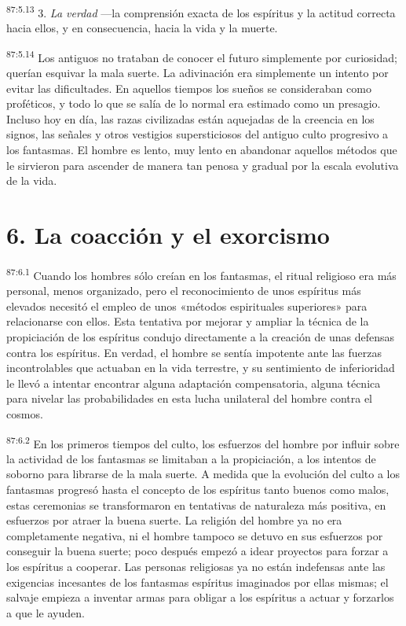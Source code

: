 \par
\textsuperscript{87:5.13} 3. \textit{La verdad} ---la comprensión exacta de los espíritus y la actitud correcta hacia ellos, y en consecuencia, hacia la vida y la muerte.

\par
\textsuperscript{87:5.14} Los antiguos no trataban de conocer el futuro simplemente por curiosidad; querían esquivar la mala suerte. La adivinación era simplemente un intento por evitar las dificultades. En aquellos tiempos los sueños se consideraban como proféticos, y todo lo que se salía de lo normal era estimado como un presagio. Incluso hoy en día, las razas civilizadas están aquejadas de la creencia en los signos, las señales y otros vestigios supersticiosos del antiguo culto progresivo a los fantasmas. El hombre es lento, muy lento en abandonar aquellos métodos que le sirvieron para ascender de manera tan penosa y gradual por la escala evolutiva de la vida.

\section*{6. La coacción y el exorcismo}
\par
\textsuperscript{87:6.1} Cuando los hombres sólo creían en los fantasmas, el ritual religioso era más personal, menos organizado, pero el reconocimiento de unos espíritus más elevados necesitó el empleo de unos «métodos espirituales superiores» para relacionarse con ellos. Esta tentativa por mejorar y ampliar la técnica de la propiciación de los espíritus condujo directamente a la creación de unas defensas contra los espíritus. En verdad, el hombre se sentía impotente ante las fuerzas incontrolables que actuaban en la vida terrestre, y su sentimiento de inferioridad le llevó a intentar encontrar alguna adaptación compensatoria, alguna técnica para nivelar las probabilidades en esta lucha unilateral del hombre contra el cosmos.

\par
\textsuperscript{87:6.2} En los primeros tiempos del culto, los esfuerzos del hombre por influir sobre la actividad de los fantasmas se limitaban a la propiciación, a los intentos de soborno para librarse de la mala suerte. A medida que la evolución del culto a los fantasmas progresó hasta el concepto de los espíritus tanto buenos como malos, estas ceremonias se transformaron en tentativas de naturaleza más positiva, en esfuerzos por atraer la buena suerte. La religión del hombre ya no era completamente negativa, ni el hombre tampoco se detuvo en sus esfuerzos por conseguir la buena suerte; poco después empezó a idear proyectos para forzar a los espíritus a cooperar. Las personas religiosas ya no están indefensas ante las exigencias incesantes de los fantasmas espíritus imaginados por ellas mismas; el salvaje empieza a inventar armas para obligar a los espíritus a actuar y forzarlos a que le ayuden.

